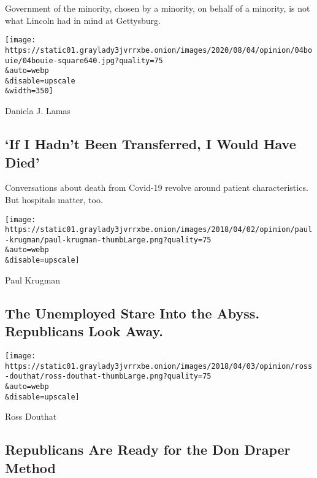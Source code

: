 Government of the minority, chosen by a minority, on behalf of a
minority, is not what Lincoln had in mind at Gettysburg.

\href{/2020/08/04/opinion/trump-2020-electoral-college.html}{}

\texttt{[image: https://static01.graylady3jvrrxbe.onion/images/2020/08/04/opinion/04bouie/04bouie-square640.jpg?quality=75\\\&auto=webp\\\&disable=upscale\\\&width=350]}

\href{/2020/08/04/opinion/covid-rural-hospitals.html}{}

Daniela J. Lamas

\hypertarget{if-i-hadnt-been-transferred-i-would-have-died}{%
\subsection{`If I Hadn't Been Transferred, I Would Have
Died'}\label{if-i-hadnt-been-transferred-i-would-have-died}}

Conversations about death from Covid-19 revolve around patient
characteristics. But hospitals matter, too.

\href{/2020/08/03/opinion/republicans-unemployed-coronavirus.html}{}

\texttt{[image: https://static01.graylady3jvrrxbe.onion/images/2018/04/02/opinion/paul-krugman/paul-krugman-thumbLarge.png?quality=75\\\&auto=webp\\\&disable=upscale]}

Paul Krugman

\hypertarget{the-unemployed-stare-into-the-abyss-republicans-look-away}{%
\subsection{The Unemployed Stare Into the Abyss. Republicans Look
Away.}\label{the-unemployed-stare-into-the-abyss-republicans-look-away}}

\href{/2020/08/04/opinion/trump-republicans-tea-party.html}{}

\texttt{[image: https://static01.graylady3jvrrxbe.onion/images/2018/04/03/opinion/ross-douthat/ross-douthat-thumbLarge.png?quality=75\\\&auto=webp\\\&disable=upscale]}

Ross Douthat

\hypertarget{republicans-are-ready-for-the-don-draper-method}{%
\subsection{Republicans Are Ready for the Don Draper
Method}\label{republicans-are-ready-for-the-don-draper-method}}

